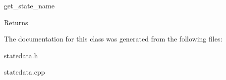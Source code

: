 get\+\_\+state\+\_\+name 

\begin{DoxyReturn}{Returns}

\end{DoxyReturn}


The documentation for this class was generated from the following files\+:\begin{DoxyCompactItemize}
\item 
statedata.\+h\item 
statedata.\+cpp\end{DoxyCompactItemize}
